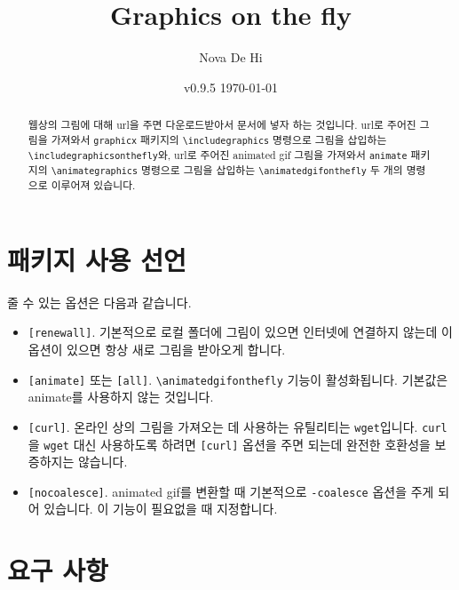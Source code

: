 \documentclass[b5paper,nanum]{oblivoir}
\def\cs#1{\texttt{\textbackslash #1}}
\begin{document}
\title{Graphics on the fly}
\author{Nova De Hi}
\date{v0.9.5 \today}

\maketitle

\begin{abstract}
웹상의 그림에 대해 url을 주면 다운로드받아서 문서에 넣자 하는 것입니다.
url로 주어진 그림을 가져와서 \texttt{graphicx} 패키지의 \cs{includegraphics} 명령으로
그림을 삽입하는 \cs{includegraphicsonthefly}와, url로 주어진 animated gif 그림을 가져와서
\texttt{animate} 패키지의 \cs{animategraphics} 명령으로 그림을 삽입하는 \cs{animatedgifonthefly} 두 개의 명령으로 이루어져 있습니다.
\end{abstract}

\tableofcontents*

\section{패키지 사용 선언}

\begin{boxedverbatim}
\usepackage[options]{graphicsonthefly}
\end{boxedverbatim}

줄 수 있는 옵션은 다음과 같습니다.
\begin{itemize}
\item \texttt{[renewall]}. 기본적으로 로컬 폴더에 그림이 있으면 인터넷에 연결하지 않는데 이 옵션이 있으면 항상 새로 그림을 받아오게 합니다.
\item \texttt{[animate]} 또는 \texttt{[all]}. \cs{animatedgifonthefly} 기능이 활성화됩니다. 기본값은 animate를 사용하지 않는 것입니다.
\item \texttt{[curl]}. 온라인 상의 그림을 가져오는 데 사용하는 유틸리티는 \texttt{wget}입니다. \texttt{curl}을 \texttt{wget} 대신 사용하도록 하려면 \texttt{[curl]} 옵션을 주면 되는데 완전한 호환성을 보증하지는 않습니다.
\item \texttt{[nocoalesce]}. animated gif를 변환할 때 기본적으로 \texttt{-coalesce} 옵션을 주게 되어 있습니다. 이 기능이 필요없을 때 지정합니다.
\end{itemize}

\section{요구 사항}
\end{document}
